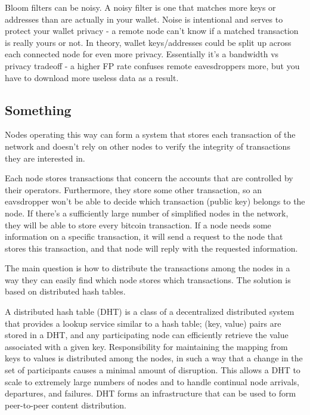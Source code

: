 \documentclass[a4paper,12pt]{article}
\begin{document}
Bloom filters can be noisy. A noisy filter is one that matches more keys or addresses than are actually in your wallet. Noise is intentional and serves to protect your wallet privacy - a remote node can't know if a matched transaction is really yours or not. In theory, wallet keys/addresses could be split up across each connected node for even more privacy. Essentially it's a bandwidth vs privacy tradeoff - a higher FP rate confuses remote eavesdroppers more, but you have to download more useless data as a result.


\subsection{Something}

Nodes operating this way can form a system that stores each transaction of the network and doesn't rely on other nodes to verify the integrity of transactions they are interested in.

Each node stores transactions that concern the accounts that are controlled by their operators. Furthermore, they store some other transaction, so an eavsdropper won't be able to decide which transaction (public key) belongs to the node. If there's a sufficiently large number of simplified nodes in the network, they will be able to store every bitcoin transaction. If a node needs some information on a specific transaction, it will send a request to the node that stores this transaction, and that node will reply with the requested information.

The main question is how to distribute the transactions among the nodes in a way they can easily find which node stores which transactions.
The solution is based on distributed hash tables. 

A distributed hash table (DHT) is a class of a decentralized distributed system that provides a lookup service similar to a hash table; (key, value) pairs are stored in a DHT, and any participating node can efficiently retrieve the value associated with a given key. Responsibility for maintaining the mapping from keys to values is distributed among the nodes, in such a way that a change in the set of participants causes a minimal amount of disruption. This allows a DHT to scale to extremely large numbers of nodes and to handle continual node arrivals, departures, and failures. DHT forms an infrastructure that can be used to form peer-to-peer content distribution.
\end{document}
